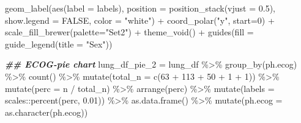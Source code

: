 \documentclass[
]{article}
\newenvironment{Shaded}{\begin{snugshade}}{\end{snugshade}}
\newcommand{\AttributeTok}[1]{\textcolor[rgb]{0.77,0.63,0.00}{#1}}
\newcommand{\ConstantTok}[1]{\textcolor[rgb]{0.00,0.00,0.00}{#1}}
\newcommand{\DecValTok}[1]{\textcolor[rgb]{0.00,0.00,0.81}{#1}}
\newcommand{\DocumentationTok}[1]{\textcolor[rgb]{0.56,0.35,0.01}{\textbf{\textit{#1}}}}
\newcommand{\FloatTok}[1]{\textcolor[rgb]{0.00,0.00,0.81}{#1}}
\newcommand{\FunctionTok}[1]{\textcolor[rgb]{0.00,0.00,0.00}{#1}}
\newcommand{\NormalTok}[1]{#1}
\newcommand{\OtherTok}[1]{\textcolor[rgb]{0.56,0.35,0.01}{#1}}
\newcommand{\SpecialCharTok}[1]{\textcolor[rgb]{0.00,0.00,0.00}{#1}}
\newcommand{\StringTok}[1]{\textcolor[rgb]{0.31,0.60,0.02}{#1}}
\begin{document}
\begin{Shaded}
\begin{Highlighting}[]
  \FunctionTok{geom\_label}\NormalTok{(}\FunctionTok{aes}\NormalTok{(}\AttributeTok{label =}\NormalTok{ labels),}
             \AttributeTok{position =} \FunctionTok{position\_stack}\NormalTok{(}\AttributeTok{vjust =} \FloatTok{0.5}\NormalTok{),}
             \AttributeTok{show.legend =} \ConstantTok{FALSE}\NormalTok{,}
             \AttributeTok{color =} \StringTok{"white"}\NormalTok{) }\SpecialCharTok{+}
  \FunctionTok{coord\_polar}\NormalTok{(}\StringTok{"y"}\NormalTok{, }\AttributeTok{start=}\DecValTok{0}\NormalTok{) }\SpecialCharTok{+}
  \FunctionTok{scale\_fill\_brewer}\NormalTok{(}\AttributeTok{palette=}\StringTok{"Set2"}\NormalTok{) }\SpecialCharTok{+}
  \FunctionTok{theme\_void}\NormalTok{() }\SpecialCharTok{+}
  \FunctionTok{guides}\NormalTok{(}\AttributeTok{fill =} \FunctionTok{guide\_legend}\NormalTok{(}\AttributeTok{title =} \StringTok{"Sex"}\NormalTok{)) }

\DocumentationTok{\#\# ECOG{-}pie chart}
\NormalTok{lung\_df\_pie\_2 }\OtherTok{=}\NormalTok{ lung\_df }\SpecialCharTok{\%\textgreater{}\%} 
  \FunctionTok{group\_by}\NormalTok{(ph.ecog) }\SpecialCharTok{\%\textgreater{}\%} 
  \FunctionTok{count}\NormalTok{() }\SpecialCharTok{\%\textgreater{}\%} 
  \FunctionTok{mutate}\NormalTok{(}\AttributeTok{total\_n =} \FunctionTok{c}\NormalTok{(}\DecValTok{63} \SpecialCharTok{+} \DecValTok{113} \SpecialCharTok{+} \DecValTok{50} \SpecialCharTok{+} \DecValTok{1} \SpecialCharTok{+} \DecValTok{1}\NormalTok{)) }\SpecialCharTok{\%\textgreater{}\%} 
  \FunctionTok{mutate}\NormalTok{(}\AttributeTok{perc =} \StringTok{\textasciigrave{}}\AttributeTok{n}\StringTok{\textasciigrave{}} \SpecialCharTok{/} \StringTok{\textasciigrave{}}\AttributeTok{total\_n}\StringTok{\textasciigrave{}}\NormalTok{) }\SpecialCharTok{\%\textgreater{}\%} 
  \FunctionTok{arrange}\NormalTok{(perc) }\SpecialCharTok{\%\textgreater{}\%}
  \FunctionTok{mutate}\NormalTok{(}\AttributeTok{labels =}\NormalTok{ scales}\SpecialCharTok{::}\FunctionTok{percent}\NormalTok{(perc, }\FloatTok{0.01}\NormalTok{)) }\SpecialCharTok{\%\textgreater{}\%}
  \FunctionTok{as.data.frame}\NormalTok{() }\SpecialCharTok{\%\textgreater{}\%}
  \FunctionTok{mutate}\NormalTok{(}\AttributeTok{ph.ecog =} \FunctionTok{as.character}\NormalTok{(ph.ecog)) }
         

\end{Highlighting}
\end{Shaded}
\end{document}
